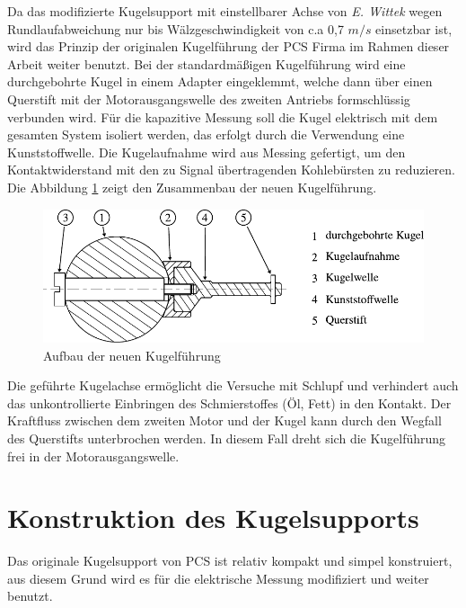 Da das modifizierte Kugelsupport mit einstellbarer Achse von \textit{E. Wittek} \cite{wittek_2007} wegen Rundlaufabweichung nur bis Wälzgeschwindigkeit von c.a 0,7 $m/s$ einsetzbar ist, wird das Prinzip der originalen Kugelführung der PCS Firma im Rahmen dieser Arbeit weiter benutzt.
Bei der standardmäßigen Kugelführung wird eine durchgebohrte Kugel in einem Adapter eingeklemmt, welche dann über einen Querstift mit der Motorausgangswelle des zweiten Antriebs formschlüssig verbunden wird.
Für die kapazitive Messung soll die Kugel elektrisch mit dem gesamten System isoliert werden, das erfolgt durch die Verwendung eine Kunststoffwelle.
Die Kugelaufnahme wird aus Messing gefertigt, um den Kontaktwiderstand mit den zu Signal übertragenden Kohlebürsten zu reduzieren.
Die Abbildung \ref{fig:aufbau_der_neuen_kugelfuehrung} zeigt den Zusammenbau der neuen Kugelführung.
\begin{figure}[htb]
    \centering
    \includegraphics[]{./images/durchgebohrte_kugel.pdf}
    \caption{Aufbau der neuen Kugelführung}
    \label{fig:aufbau_der_neuen_kugelfuehrung}
\end{figure}
%

Die geführte Kugelachse ermöglicht die Versuche mit Schlupf und verhindert auch das unkontrollierte Einbringen des Schmierstoffes (Öl, Fett) in den Kontakt.
Der Kraftfluss zwischen dem zweiten Motor und der Kugel kann durch den Wegfall des Querstifts unterbrochen werden.
In diesem Fall dreht sich die Kugelführung frei in der Motorausgangswelle.

\section{Konstruktion des Kugelsupports}
\label{sec:konstruktion_des_kugelsupports}

Das originale Kugelsupport von PCS ist relativ kompakt und simpel konstruiert, aus diesem Grund wird es für die elektrische Messung modifiziert und weiter benutzt.

